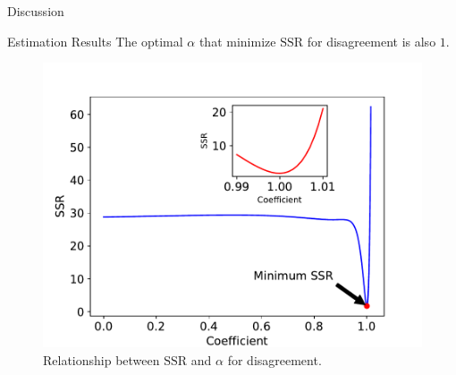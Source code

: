 \documentclass[UTF8, 10pt]{beamer}
\begin{document}
\begin{CJK*}{UTF8}{gbsn}
\begin{frame}{Discussion}
\begin{itemize}
	\end{itemize}
\end{frame}
\begin{frame}{Estimation Results}
	\center The optimal $\alpha$ that minimize $\mathrm{SSR}$ for disagreement is also $1$.
	\begin{figure}[htpb]
	  \begin{center}
	    \includegraphics[width=0.7 \linewidth]
	    {pic/Figure_5.pdf}
	    \caption{Relationship between $\mathrm{SSR}$ and $\alpha$ for disagreement.}
	  \end{center}
	\end{figure}
\end{frame}


\end{CJK*}
\end{document}
